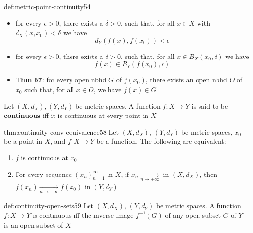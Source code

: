 \documentclass[landscape, 8pt]{extarticle}
\begin{document}
\begin{multicols}{3}
\begin{dfn}{def:metric-point-continuity}{54}
    \begin{itemize}[leftmargin=*]
        \item for every $\epsilon > 0$, there exists a $\delta > 0$, such that, for all $x\in X$ with $d_{X}(x,x_{0}) < \delta$ we have 
            \[d_{Y}(f(x), f(x_{0})) < \epsilon\]
        \item for every $\epsilon > 0$, there exists a $\delta > 0$, such that, for all $x\in B_{X}(x_{0}, \delta)$ we have 
            \[f(x)\in B_{Y}(f(x_{0}), \epsilon)\]
        \item \textbf{Thm 57}: for every open nbhd $G$ of $f(x_{0})$, there exists an open nbhd $O$ of $x_{0}$ such that, for all $x\in O$, we have $f(x) \in G$

    \end{itemize}

    \vspace{-5pt}

    Let $(X, d_{X}), (Y, d_{Y})$ be metric spaces. A function $f: X \to Y $ is said to be \textbf{continuous} iff it is continuous at every point in $X$
\end{dfn}

\vspace{-5pt}
\begin{thm}{thm:continuity-conv-equivalence}{58}
    \vspace{-5pt}
    Let $(X, d_{X}),\, (Y, d_{Y})$ be metric spaces, $x_{0}$ be a point in $X$, and $f : X \to Y$ be a function. The following are equivalent:
    \vspace{-5pt}
    \begin{enumerate}
        \item $f$ is continuous at $x_{0}$
        \item For every sequence $(x_{n})^{\infty}_{n = 1}$ in $X$, if $x_{n}\xrightarrow[n\to +\infty]{}$ in $(X, d_{X})$, then $f(x_{n}) \xrightarrow[n\to +\infty]{} f(x_{0})$ in $(Y, d_{Y})$
    \end{enumerate}
\end{thm}

\vspace{-5pt}
\begin{thm}{def:continuity-open-sets}{59}
    Let $(X, d_{X}),\,(Y, d_{Y})$ be metric spaces. A function $f: X \to Y $ is continuous iff the inverse image $f^{-1}(G)$ of any open subset $G$ of $Y$ is an open subset of $X$
\end{thm}


\end{multicols}
\end{document}
